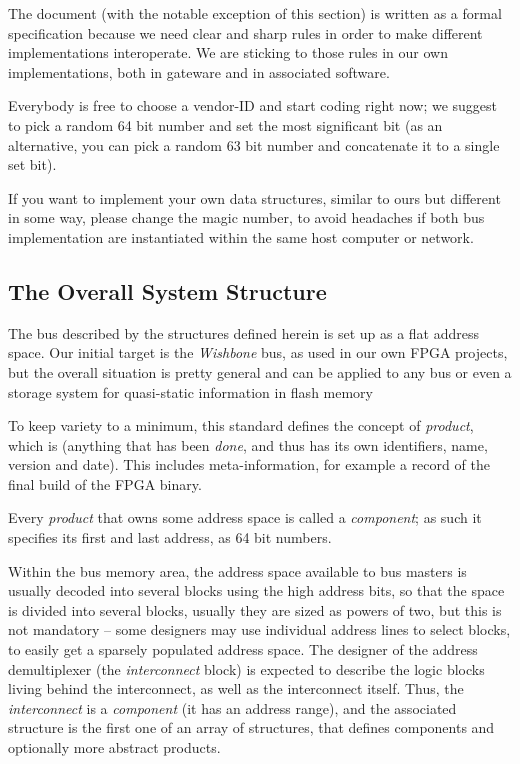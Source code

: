 \documentclass[a4paper, 12pt]{article}
\begin{document}
The document (with the notable exception of this section) is written
as a formal specification because we need clear and sharp rules in
order to make different implementations interoperate.  We are sticking
to those rules in our own implementations, both in gateware and in
associated software.

Everybody is free to choose a vendor-ID and start coding right now; we
suggest to pick a random 64 bit number and set the most significant
bit (as an alternative, you can pick a random 63 bit number and
concatenate it to a single set bit).

If you want to implement your own data structures, similar to ours
but different in some way, please change the magic number, to avoid
headaches if both bus implementation are instantiated within the same host
computer or network.

\subsection{The Overall System Structure}

The bus described by the structures defined herein is set up as a
flat address space. Our initial target is the \textit{Wishbone} bus,
as used in our own FPGA projects, but the overall situation is
pretty general and can be applied to any bus or even a storage
system for quasi-static information in flash memory

To keep variety to a minimum, this standard defines the concept of
\textit{product}, which is (anything that has been \textit{done}, and thus has
its own identifiers, name, version and date).  This includes
meta-information, for example a record of the final build of the
FPGA binary.

Every \textit{product} that owns some address space is called a
\textit{component}; as such it specifies its first and last address, as
64 bit numbers.

Within the bus memory area, the address space available to bus masters
is usually decoded into several blocks using the high address bits, so
that the space is divided into several blocks, usually they are sized
as powers of two, but this is not mandatory -- some designers may use
individual address lines to select blocks, to easily get a sparsely
populated address space.  The designer of the address demultiplexer
(the \textit{interconnect} block) is expected to describe the
logic blocks living behind the interconnect, as well as the
interconnect itself. Thus, the \textit{interconnect} is a \textit{component}
(it has an address range), and the associated structure is the first
one of an array of structures, that defines components and optionally
more abstract products.
\end{document}
